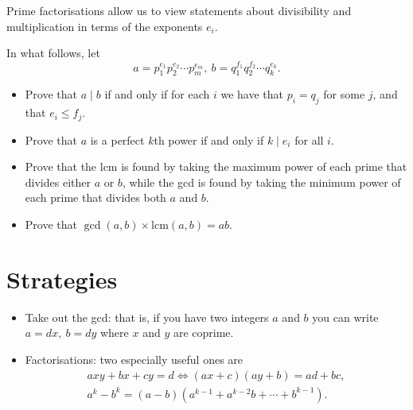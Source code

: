 \documentclass{article}
\begin{document}
Prime factorisations allow us to view statements about divisibility and
multiplication in terms of the exponents $e_i$.

In what follows, let
\[a=p_1^{e_1}p_2^{e_2}\cdots p_m^{e_m},\
	b=q_1^{f_1}q_2^{f_2}\cdots q_k^{e_k}.\]
\begin{itemize}
	\item Prove that $a\mid b$ if and only if for each $i$ we have that $p_i=q_j$
	      for some $j$, and that $e_i\le f_j$.
	\item Prove that $a$ is a perfect $k$th power if and only if $k\mid e_i$ for all $i$.
	\item Prove that the lcm is found by taking the maximum power of each prime that
	      divides either $a$ or $b$, while the gcd is found by taking the minimum power of
	      each prime that divides both $a$ and $b$.
	\item Prove that $\gcd(a,b)\times\mathrm{lcm}(a,b)=ab$.
\end{itemize}
\section{Strategies}
\begin{itemize}
	\item Take out the gcd: that is, if you have two integers $a$ and $b$ you
	      can write $a=dx,\ b=dy$ where $x$ and $y$ are coprime.
	\item Factorisations: two especially useful ones are
	      \begin{align*}
		      axy+bx+cy=d\iff (ax+c)(ay+b)=ad+bc, \\
		      a^k-b^k=(a-b)\left(a^{k-1}+a^{k-2}b+\cdots+b^{k-1}\right).
	      \end{align*}
\end{itemize}
\end{document}
